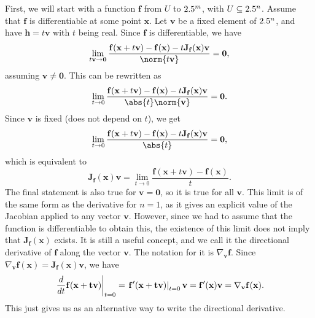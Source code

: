 \documentclass[a4paper,12pt]{article}
\begin{document}
\begin{appendices}
First, we will start with a function $\mathbf{f}$ from $U$ to $2.5^m$, with $U \subseteq 2.5^n$.
Assume that $\mathbf{f}$ is differentiable at some point $\mathbf{x}$.
Let $\mathbf{v}$ be a fixed element of $2.5^n$, and have $\mathbf{h} = t\mathbf{v}$ with $t$ being real.
Since $\mathbf{f}$ is differentiable, we have
\begin{equation*}
    \lim_{t\mathbf{v} \to \mathbf{0}} \frac{\mathbf{f}(\mathbf{x}+t\mathbf{v}) - \mathbf{f}(\mathbf{x}) - t\mathbf{J_f}(\mathbf{x})\mathbf{v}}{\norm{t\mathbf{v}}} = \mathbf{0},
\end{equation*}
assuming $\mathbf{v} \neq \mathbf{0}$.
This can be rewritten as
\begin{equation*}
    \lim_{t \to 0} \frac{\mathbf{f}(\mathbf{x}+t\mathbf{v}) - \mathbf{f}(\mathbf{x}) - t\mathbf{J_f}(\mathbf{x})\mathbf{v}}{\abs{t}\norm{\mathbf{v}}} = \mathbf{0}.
\end{equation*}
Since $\mathbf{v}$ is fixed (does not depend on $t$), we get
\begin{equation*}
    \lim_{t \to 0} \frac{\mathbf{f}(\mathbf{x}+t\mathbf{v}) - \mathbf{f}(\mathbf{x}) - t\mathbf{J_f}(\mathbf{x})\mathbf{v}}{\abs{t}} = \mathbf{0},
\end{equation*}
which is equivalent to
\begin{equation*}
    \mathbf{J_f}(\mathbf{x})\mathbf{v} = \lim_{t \to 0} \frac{\mathbf{f}(\mathbf{x}+t\mathbf{v}) - \mathbf{f}(\mathbf{x})}{t}.
\end{equation*}
The final statement is also true for $\mathbf{v} = \mathbf{0}$, so it is true for all $\mathbf{v}$.
This limit is of the same form as the derivative for $n=1$, as it gives an explicit value of the Jacobian applied to any vector $\mathbf{v}$.
However, since we had to assume that the function is differentiable to obtain this, the existence of this limit does not imply that $\mathbf{J_f}(\mathbf{x})$ exists.
It is still a useful concept, and we call it the directional derivative of $\mathbf{f}$ along the vector $\mathbf{v}$.
The notation for it is $\nabla_\mathbf{v}\mathbf{f}$.
Since $\nabla_\mathbf{v}\mathbf{f}(\mathbf{x}) = \mathbf{J_f}(\mathbf{x})\mathbf{v}$, we have
\begin{equation*}
    \eval{\frac{d}{dt} \mathbf{f}(\mathbf{x+t\mathbf{v}})}{t=0} = \eval{\mathbf{f}'(\mathbf{x+t\mathbf{v}})}{t=0} \mathbf{v} = \mathbf{f}'(\mathbf{x})\mathbf{v} = \nabla_\mathbf{v}\mathbf{f}(\mathbf{x}).
\end{equation*}
This just gives us as an alternative way to write the directional derivative.

\end{appendices}
\end{document}
